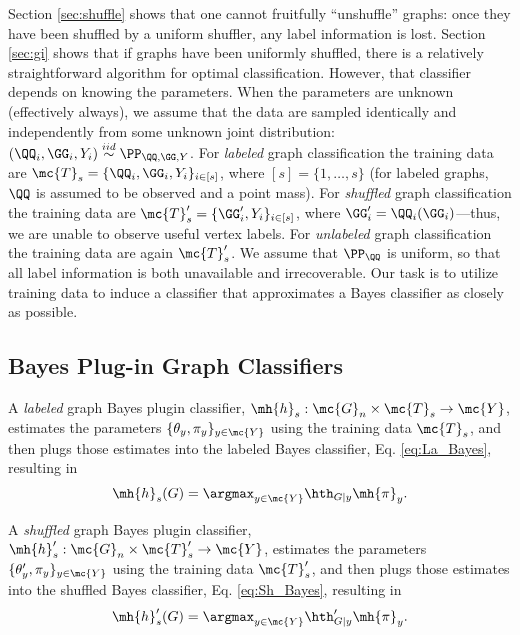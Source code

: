 \documentclass[10pt,journal,cspaper,compsoc]{IEEEtran}
\begin{document}
Section \ref{sec:shuffle} shows that one cannot fruitfully ``unshuffle'' graphs: once they have been shuffled by a uniform shuffler, any label information is lost.  Section \ref{sec:gi} shows that if graphs have been uniformly shuffled, there is a relatively straightforward algorithm for optimal classification. However, that classifier depends on knowing the parameters.
When the parameters are unknown (effectively always), we assume that the data are sampled identically and independently from some unknown joint distribution: $(\QQ_i,\GG_i,Y_i)\overset{iid}{\sim}\PP_{\QQ,\GG,Y}$.  
For \emph{labeled} graph classification the training data are $\mc{T}_s=\{\QQ_i,\GG_i,Y_i\}_{i \in [s]}$, where $[s]=\{1,\ldots,s\}$ (for labeled graphs, $\QQ$ is assumed to be observed and a point mass).  
For \emph{shuffled} graph classification the training data are $\mc{T}_s'=\{\GG_i',Y_i\}_{i \in [s]}$, where $\GG_i'=\QQ_i(\GG_i)$---thus, we are unable to observe useful vertex labels.  For \emph{unlabeled} graph classification the training data are again $\mc{T}_s'$. We assume that $\PP_{\QQ}$ is uniform, so that all label information is both unavailable and irrecoverable.  Our task is to utilize training data to induce a classifier
that approximates 
a Bayes classifier
as closely as possible.  



\subsection{Bayes Plug-in Graph Classifiers} %
\label{sec:bayes_optimal_graph_invariant_based_classifier}



A \emph{labeled} graph Bayes plugin classifier,
$\mh{h}_s: \mc{G}_n \times \mc{T}_s \to \mc{Y}$,
estimates the parameters $\{\theta_y,\pi_y\}_{y \in \mc{Y}}$ using the training data $\mc{T}_s$, and then plugs those estimates into the labeled Bayes classifier, Eq. \eqref{eq:La_Bayes}, resulting in
\begin{align} \label{eq:La_Plug}
	\mh{h}_s(G)=\argmax_{y\in\mc{Y}} \hth_{G|y}\mh{\pi}_y.
\end{align}

A \emph{shuffled} graph Bayes plugin classifier,
$\mh{h}_s': \mc{G}_n \times \mc{T}_s' \to \mc{Y}$,
estimates the parameters $\{\theta_y',\pi_y\}_{y \in \mc{Y}}$ using the training data $\mc{T}_s'$, and then plugs those estimates into the shuffled Bayes classifier, Eq. \eqref{eq:Sh_Bayes}, resulting in
\begin{align} \label{eq:Sh_Plug}
	\mh{h}_s'(G)=\argmax_{y\in\mc{Y}} \hth_{G|y}'\mh{\pi}_y.
\end{align}
\end{document}
